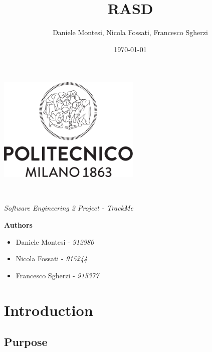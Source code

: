 \documentclass[a4paper,oneside,11pt]{article}
\title{RASD}
\author{Daniele Montesi, Nicola Fossati, Francesco Sgherzi}
\date{\today}
\begin{document}
    \begin{titlingpage} 
        \begin{center}
            \includegraphics[height=5cm]{assets/Logo_Politecnico_Milano.png}\\
            \vspace{4cm}
            \begin{huge} 
                \textbf{\thetitle} \\
            \end{huge}
            \vspace{0.3cm}
            \begin{Large}
                \textit{Software Engineering 2 Project - TrackMe} \\
            \end{Large}
        \end{center}
        \begin{large}
            \vspace{4cm}
            \textbf{Authors}
            \begin{itemize}
                \item Daniele Montesi - \textit{912980} 
                \item Nicola Fossati - \textit{915244}
                \item Francesco Sgherzi - \textit{915377}
            \end{itemize}
        \end{large}
    \end{titlingpage}
    \newpage
    \tableofcontents
    \newpage
    \section{Introduction}
    
        \subsection{Purpose}
            
\end{document}
